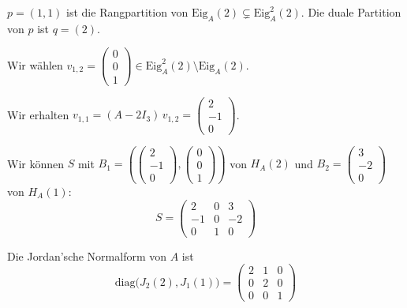 \documentclass[a4paper,12pt]{article}
\begin{document}
\begin{enumerate}[label=\alph*)]
  $p = (1,1)$ ist die Rangpartition von $\mathrm{Eig}_A(2) \subsetneq \mathrm{Eig}_A^2(2)$.
  Die duale Partition von $p$ ist $q = (2)$.

  Wir wählen $v_{1,2} = \begin{pmatrix} 0 \\ 0 \\ 1 \end{pmatrix}
  \in \mathrm{Eig}_A^2(2) \setminus \mathrm{Eig}_A(2)$.

  Wir erhalten $v_{1,1} = (A - 2I_3)\, v_{1,2} = \begin{pmatrix} 2 \\ -1 \\ 0 \end{pmatrix}$.

  Wir können $S$ mit $B_1 = \left( \begin{pmatrix} 2 \\ -1 \\ 0 \end{pmatrix},
  \begin{pmatrix} 0 \\ 0 \\ 1 \end{pmatrix} \right)$ von $H_A(2)$ und
  $B_2 = \begin{pmatrix} 3 \\ -2 \\ 0 \end{pmatrix}$ von $H_A(1)$:
  \[
    S = \begin{pmatrix} 2 & 0 & 3 \\ -1 & 0 & -2 \\ 0 & 1 & 0 \end{pmatrix}
  \]

  Die Jordan'sche Normalform von $A$ ist
  \[
    \mathrm{diag}\big( J_2(2), J_1(1) \big)
    = \begin{pmatrix} 2 & 1 & 0 \\ 0 & 2 & 0 \\ 0 & 0 & 1 \end{pmatrix}
  \]
\end{enumerate}
\end{document}
